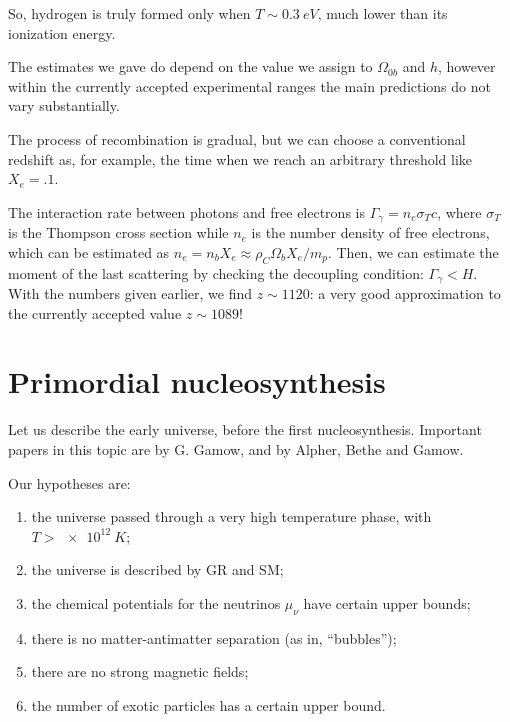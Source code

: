 \documentclass[main.tex]{subfiles}
\begin{document}
So, hydrogen is truly formed only when \(T \sim \SI{0.3}{eV}\), much lower than its ionization energy.

The estimates we gave do depend on the value we assign to \(\Omega_{0b}\) and \(h\), however within the currently accepted experimental ranges the main predictions do not vary substantially. 

The process of recombination is gradual, but we can choose a conventional redshift as, for example, the time when we reach an arbitrary threshold like \(X_e = \num{.1}\). 

The interaction rate between photons and free electrons is \(\Gamma_{\gamma } = n_e \sigma_T c\), where \(\sigma _T\) is the Thompson cross section while \(n_e\) is the number density of free electrons, which can be estimated as \(n_e = n_b X_e \approx \rho_C \Omega_{b} X_e / m_p\). 
Then, we can estimate the moment of the last scattering by checking the decoupling condition: \(\Gamma _\gamma < H\). 
With the numbers given earlier, we find \(z \sim 1120\): a very good approximation to the currently accepted value \(z \sim 1089\)!



\section{Primordial nucleosynthesis}

Let us describe the early universe, before the first nucleosynthesis.
Important papers in this topic are by G. Gamow, and by Alpher, Bethe and Gamow.

Our hypotheses are:
%
\begin{enumerate}
    \item the universe passed through a very high temperature phase, with \(T > \SI{e12}{K}\);
    \item the universe is described by GR and SM;
    \item the chemical potentials for the neutrinos \(\mu_{\nu }\) have certain upper bounds; 
    \item there is no matter-antimatter separation (as in, ``bubbles'');
    \item there are no strong magnetic fields;
    \item the number of exotic particles has a certain upper bound.
\end{enumerate}
\end{document}
